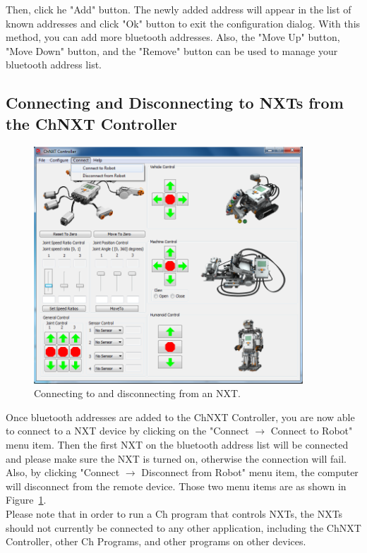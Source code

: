 \documentclass[11pt]{article}
\begin{document}
Then, click he "Add" button. The newly added address will appear in the list of known addresses and click "Ok" button to exit 
the configuration dialog. With this method, you can add more bluetooth addresses. Also, the "Move Up" button, "Move Down" 
button, and the "Remove" button can be used to manage your bluetooth address list.

\subsection{Connecting and Disconnecting to NXTs from the ChNXT Controller}
\begin{figure}[!h]
  \begin{center}
    \includegraphics[height=3.5in]{figure/configuration/menuConnect.png}
    \caption{Connecting to and disconnecting from an NXT.\label{fig:menu_connect}}
  \end{center}
\end{figure}

Once bluetooth addresses are added to the ChNXT Controller, you are now able to connect to a NXT device by clicking on the 
"Connect $\rightarrow$ Connect to Robot" menu item. Then the first NXT on the bluetooth address list will be connected and please make
sure the NXT is turned on, otherwise the connection will fail. Also, by clicking "Connect $\rightarrow$ Disconnect from Robot" menu 
item, the computer will disconnect from the remote device. Those two menu items are as shown in Figure~\ref{fig:menu_connect}.\\

Please note that in order to run a Ch program that controls NXTs, the NXTs should not currently be connected to any other
application, including the ChNXT Controller, other Ch Programs, and other programs on other devices.\\
\end{document}
